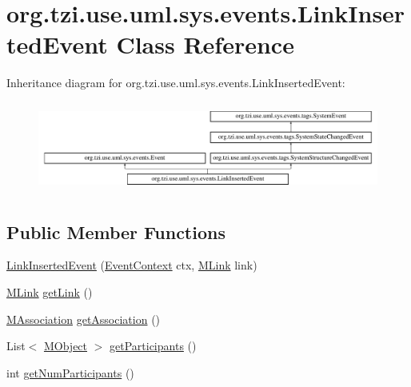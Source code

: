 \hypertarget{classorg_1_1tzi_1_1use_1_1uml_1_1sys_1_1events_1_1_link_inserted_event}{\section{org.\-tzi.\-use.\-uml.\-sys.\-events.\-Link\-Inserted\-Event Class Reference}
\label{classorg_1_1tzi_1_1use_1_1uml_1_1sys_1_1events_1_1_link_inserted_event}
}
Inheritance diagram for org.\-tzi.\-use.\-uml.\-sys.\-events.\-Link\-Inserted\-Event\-:\begin{figure}[H]
\begin{center}
\leavevmode
\includegraphics[height=3.010753cm]{classorg_1_1tzi_1_1use_1_1uml_1_1sys_1_1events_1_1_link_inserted_event}
\end{center}
\end{figure}
\subsection*{Public Member Functions}
\begin{DoxyCompactItemize}
\item 
\hyperlink{classorg_1_1tzi_1_1use_1_1uml_1_1sys_1_1events_1_1_link_inserted_event_ab0b0cd3c97eac9e152f48db0c1b56b5e}{Link\-Inserted\-Event} (\hyperlink{enumorg_1_1tzi_1_1use_1_1uml_1_1sys_1_1events_1_1tags_1_1_event_context}{Event\-Context} ctx, \hyperlink{interfaceorg_1_1tzi_1_1use_1_1uml_1_1sys_1_1_m_link}{M\-Link} link)
\item 
\hyperlink{interfaceorg_1_1tzi_1_1use_1_1uml_1_1sys_1_1_m_link}{M\-Link} \hyperlink{classorg_1_1tzi_1_1use_1_1uml_1_1sys_1_1events_1_1_link_inserted_event_a06a83c47c54a632174ed49a657e61fb3}{get\-Link} ()
\item 
\hyperlink{interfaceorg_1_1tzi_1_1use_1_1uml_1_1mm_1_1_m_association}{M\-Association} \hyperlink{classorg_1_1tzi_1_1use_1_1uml_1_1sys_1_1events_1_1_link_inserted_event_abf5faf60fcbe3f97973968c4a2827f09}{get\-Association} ()
\item 
List$<$ \hyperlink{interfaceorg_1_1tzi_1_1use_1_1uml_1_1sys_1_1_m_object}{M\-Object} $>$ \hyperlink{classorg_1_1tzi_1_1use_1_1uml_1_1sys_1_1events_1_1_link_inserted_event_aef19c351389e68901d61b688b22d2eed}{get\-Participants} ()
\item 
int \hyperlink{classorg_1_1tzi_1_1use_1_1uml_1_1sys_1_1events_1_1_link_inserted_event_ab8b93c9c395e858aeee982cf04c0f83b}{get\-Num\-Participants} ()
\end{DoxyCompactItemize}


